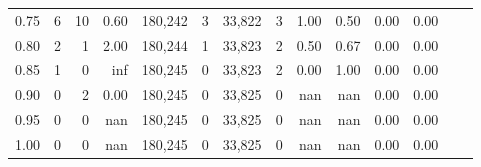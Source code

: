 \begin{tabular}{rrrrrrrrrrrrrr}
0.75 &       6 &     10 &    0.60 &  180,242 &        3 &  33,822 &       3 &  1.00 &  0.50 &  0.00 &      0.00 \\
0.80 &       2 &      1 &    2.00 &  180,244 &        1 &  33,823 &       2 &  0.50 &  0.67 &  0.00 &      0.00 \\
0.85 &       1 &      0 &     inf &  180,245 &        0 &  33,823 &       2 &  0.00 &  1.00 &  0.00 &      0.00 \\
0.90 &       0 &      2 &    0.00 &  180,245 &        0 &  33,825 &       0 &   nan &   nan &  0.00 &      0.00 \\
0.95 &       0 &      0 &     nan &  180,245 &        0 &  33,825 &       0 &   nan &   nan &  0.00 &      0.00 \\
1.00 &       0 &      0 &     nan &  180,245 &        0 &  33,825 &       0 &   nan &   nan &  0.00 &      0.00 \\
\bottomrule
\end{tabular}
